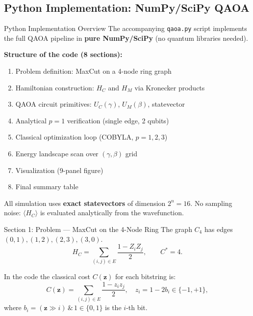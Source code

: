 \documentclass{beamer}
\begin{document}
\begin{frame}


\section{Python Implementation: NumPy/SciPy QAOA}

\begin{frame}{Python Implementation Overview}
The accompanying \texttt{qaoa.py} script implements the full QAOA
pipeline in \textbf{pure NumPy/SciPy} (no quantum libraries needed).

\medskip

\textbf{Structure of the code (8 sections):}
\begin{enumerate}
  \item Problem definition: MaxCut on a 4-node ring graph
  \item Hamiltonian construction: $H_C$ and $H_M$ via Kronecker products
  \item QAOA circuit primitives: $U_C(\gamma)$, $U_M(\beta)$, statevector
  \item Analytical $p=1$ verification (single edge, 2 qubits)
  \item Classical optimization loop (COBYLA, $p=1,2,3$)
  \item Energy landscape scan over $(\gamma,\beta)$ grid
  \item Visualization (9-panel figure)
  \item Final summary table
\end{enumerate}

\medskip

All simulation uses \textbf{exact statevectors} of dimension $2^n = 16$.
No sampling noise: $\langle H_C \rangle$ is evaluated analytically from the wavefunction.
\end{frame}


\begin{frame}[fragile]{Section 1: Problem — MaxCut on the 4-Node Ring}
The graph $C_4$ has edges $(0,1),(1,2),(2,3),(3,0)$.
\[
  H_C = \sum_{(i,j)\in E}\frac{1 - Z_i Z_j}{2}, \qquad C^* = 4.
\]

In the code the classical cost $C(\mathbf{z})$ for each bitstring is:
\begin{equation}
  C(\mathbf{z}) = \sum_{(i,j)\in E} \frac{1 - z_i z_j}{2},
  \quad z_i = 1 - 2b_i \in \{-1,+1\},
\end{equation}
where $b_i = (\mathbf{z} \gg i)\,\&\,1 \in \{0,1\}$ is the $i$-th bit.


\end{frame}
\end{frame}
\end{document}
